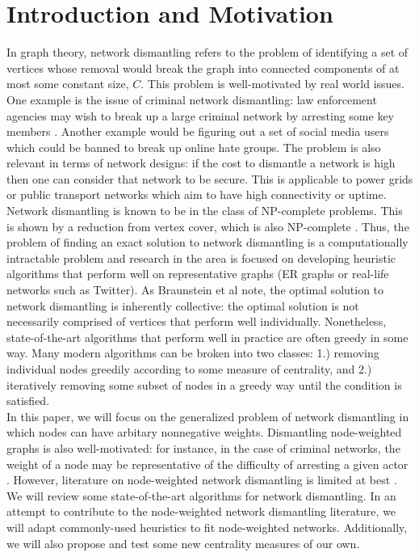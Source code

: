\documentclass{article}
\begin{document}
\section{Introduction and Motivation}
 \null\quad In graph theory, network dismantling refers to the problem of identifying a set of vertices whose removal would break the graph into connected components of at most some constant size, $C$. 
 This problem is well-motivated by real world issues. One example is the issue of criminal network dismantling: law enforcement agencies may wish to break up a large criminal network by arresting some key members \cite{tostado2022human}. 
 Another example would be figuring out a set of social media users which could be banned to break up online hate groups. 
 The problem is also relevant in terms of network designs: if the cost to dismantle a network is high then one can consider that network to be secure.
 This is applicable to power grids or public transport networks which aim to have high connectivity or uptime. \\
 \null\quad Network dismantling is known to be in the class of NP-complete problems. This is shown by a reduction from vertex cover, which is also NP-complete \cite{braunstein}. 
 Thus, the problem of finding an exact solution to network dismantling is a computationally intractable problem and research in the area is focused on developing heuristic algorithms that perform well on representative graphs (ER graphs or real-life networks such as Twitter). 
 As Braunstein et al \cite{braunstein} note, the optimal solution to network dismantling is inherently collective: the optimal solution is not necessarily comprised of vertices that perform well individually. 
 Nonetheless, state-of-the-art algorithms that perform well in practice are often greedy in some way.
 Many modern algorithms can be broken into two classes: 1.) removing individual nodes greedily according to some measure of centrality, and 2.) iteratively removing some subset of nodes in a greedy way until the condition is satisfied. \\
 \null\quad In this paper, we will focus on the generalized problem of network dismantling in which nodes can have arbitary nonnegative weights.
 Dismantling node-weighted graphs is also well-motivated: for instance, in the case of criminal networks, the weight of a node may be representative of the difficulty of arresting a given actor \cite{covert}.
 However, literature on node-weighted network dismantling is limited at best \cite{gnd}. 
 We will review some state-of-the-art algorithms for network dismantling. 
 In an attempt to contribute to the node-weighted network dismantling literature, we will adapt commonly-used heuristics to fit node-weighted networks. Additionally, we will also propose and test some new centrality measures of our own.
\end{document}
